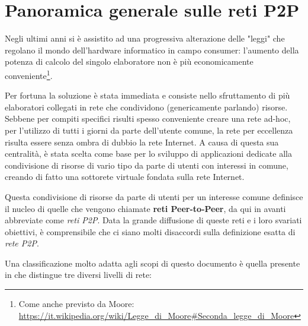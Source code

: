 \chapter{Panoramica generale sulle reti P2P}\label{panoramica-generale-sulle-reti-p2p}

Negli ultimi anni si è assistito ad una progressiva alterazione delle "leggi" che regolano il mondo dell'hardware informatico in campo consumer: l'aumento della potenza di calcolo del singolo elaboratore non è più economicamente conveniente\footnote{Come anche previsto da Moore: \url{https://it.wikipedia.org/wiki/Legge_di_Moore\#Seconda_legge_di_Moore}}.

Per fortuna la soluzione è stata immediata e consiste nello sfruttamento di più elaboratori collegati in rete che condividono (genericamente parlando) risorse. Sebbene per compiti specifici risulti spesso conveniente creare una rete ad-hoc, per l'utilizzo di tutti i giorni da parte dell'utente comune, la rete per eccellenza risulta essere senza ombra di dubbio la rete Internet. A causa di questa sua centralità, è stata scelta come base per lo sviluppo di applicazioni dedicate alla condivisione di risorse di vario tipo da parte di utenti con interessi in comune, creando di fatto una sottorete virtuale fondata sulla rete Internet.

Questa condivisione di risorse da parte di utenti per un interesse comune definisce il nucleo di quelle che vengono chiamate \textbf{reti Peer-to-Peer}, da qui in avanti abbreviate come \emph{reti P2P}. Data la grande diffusione di queste reti e i loro svariati obiettivi, è comprensibile che ci siano molti disaccordi sulla definizione esatta di \emph{rete P2P}.

Una classificazione molto adatta agli scopi di questo documento è quella presente in \cite{core-concepts-p2p} che distingue tre diversi livelli di rete:

